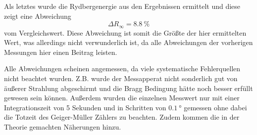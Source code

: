 Als letztes wurde die Rydbergenergie aus den Ergebnissen ermittelt und diese zeigt eine Abweichung
\begin{equation*}
    \Delta R_\infty = \SI{8.8}{\percent}
\end{equation*}
vom Vergleichswert. 
Diese Abweichung ist somit die Größte der hier ermittelten Wert, was allerdings nicht verwunderlich ist, da alle Abweichungen der vorherigen Messungen hier einen Beitrag leisten.

Alle Abweichungen scheinen angemessen, da viele systematische Fehlerquellen nicht beachtet wurden.
Z.B. wurde der Messapperat nicht sonderlich gut von äußerer Strahlung abgeschirmt und die Bragg Bedingung hätte noch besser erfüllt gewesen sein können.
Außerdem wurden die einzelnen Messwert nur mit einer Integrationszeit von 5 Sekunden und in Schritten von $\SI{0.1}{\degree}$ gemessen ohne dabei die Totzeit des Geiger-Müller Zählers zu beachten.
Zudem kommen die in der Theorie gemachten Näherungen hinzu.